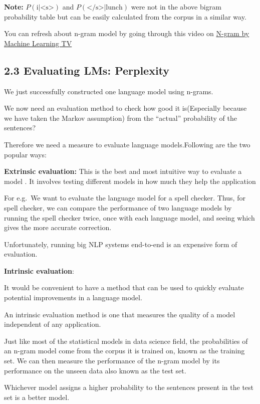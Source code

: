 \documentclass[11pt]{article}
\begin{document}
\textbf{Note:} \(P(\text{i|<s>})\) and \(P(\text{</s>|lunch})\) were not
in the above bigram probability table but can be easily calculated from
the corpus in a similar way.

You can refresh about n-gram model by going through this video on
\href{https://www.youtube.com/watch?v=GiyMGBuu45w}{N-gram by Machine
Learning TV}

    \hypertarget{evaluating-lms-perplexity}{%
\subsection{2.3 Evaluating LMs:
Perplexity}\label{evaluating-lms-perplexity}}

    We just successfully constructed one language model using n-grams.

We now need an evaluation method to check how good it is(Especially
because we have taken the Markov assumption) from the ``actual''
probability of the sentences?

Therefore we need a measure to evaluate language models.Following are
the two popular ways:

\textbf{Extrinsic evaluation:} This is the best and most intuitive way
to evaluate a model . It involves testing different models in how much
they help the application

For e.g.~We want to evaluate the language model for a spell checker.
Thus, for spell checker, we can compare the performance of two language
models by running the spell checker twice, once with each language
model, and seeing which gives the more accurate correction.

Unfortunately, running big NLP systems end-to-end is an expensive form
of evaluation.

\textbf{Intrinsic evaluation}:

It would be convenient to have a method that can be used to quickly
evaluate potential improvements in a language model.

An intrinsic evaluation method is one that measures the quality of a
model independent of any application.

Just like most of the statistical models in data science field, the
probabilities of an n-gram model come from the corpus it is trained on,
known as the training set. We can then measure the performance of the
n-gram model by its performance on the unseen data also known as the
test set.

Whichever model assigns a higher probability to the sentences present in
the test set is a better model.
\end{document}
